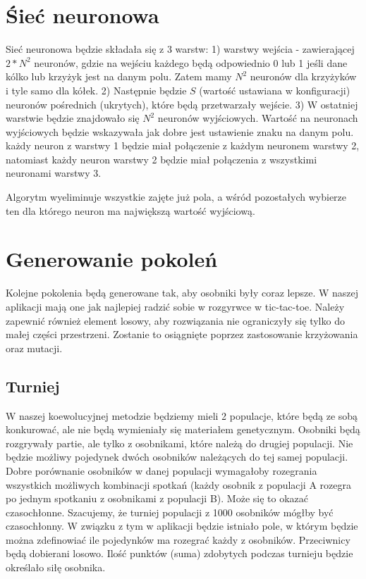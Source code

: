 \documentclass[paper=a4, fontsize=11pt]{scrartcl} %
\numberwithin{equation}{section} %
\numberwithin{figure}{section} %
\numberwithin{table}{section} %
\begin{document}
\section{Śieć neuronowa}
Sieć neuronowa będzie składała się z 3 warstw:
1) warstwy wejścia - zawierającej $2*N^2$ neuronów, gdzie na wejściu każdego będą odpowiednio 0 lub 1 jeśli dane kólko lub krzyżyk jest na danym polu. Zatem mamy $N^2$ neuronów dla krzyżyków i tyle samo dla kółek.
2) Następnie będzie $S$ (wartość ustawiana w konfiguracji) neuronów pośrednich (ukrytych), które będą przetwarzały wejście.
3) W ostatniej warstwie będzie znajdowało się $N^2$ neuronów wyjściowych. Wartość na neuronach wyjściowych będzie wskazywała jak dobre jest ustawienie znaku na danym polu. 
każdy neuron z warstwy 1 będzie miał połączenie z każdym neuronem warstwy 2, natomiast każdy neuron warstwy 2 będzie miał połączenia z wszystkimi neuronami warstwy 3. 

Algorytm wyeliminuje wszystkie zajęte już pola, a wśród pozostałych wybierze ten dla którego neuron ma największą wartość wyjściową.

\section{Generowanie pokoleń}
Kolejne pokolenia będą generowane tak, aby osobniki były coraz lepsze. W naszej aplikacji mają one jak najlepiej radzić sobie w rozgyrwce w tic-tac-toe. Należy zapewnić również element losowy, aby rozwiązania nie ograniczyły się tylko do małej części przestrzeni. Zostanie to osiągnięte poprzez zastosowanie krzyżowania oraz mutacji. 

\subsection{Turniej}
W naszej koewolucyjnej metodzie będziemy mieli 2 populacje, które będą ze sobą konkurować, ale nie będą wymieniały się materiałem genetycznym. Osobniki będą rozgrywały partie, ale tylko z osobnikami, które należą do drugiej populacji. Nie będzie możliwy pojedynek dwóch osobników należących do tej samej populacji. Dobre porównanie osobników w danej populacji wymagałoby rozegrania wszystkich możliwych kombinacji spotkań (każdy osobnik z populacji A rozegra po jednym spotkaniu z osobnikami z populacji B). Może się to okazać czasochłonne. Szacujemy, że turniej populacji z 1000 osobników mógłby być czasochłonny. W związku z tym w aplikacji będzie istniało pole, w którym będzie można zdefinowiać ile pojedynków ma rozegrać każdy z osobników. Przeciwnicy będą dobierani losowo. Ilość punktów (suma) zdobytych podczas turnieju będzie określało siłę osobnika.
\end{document}

